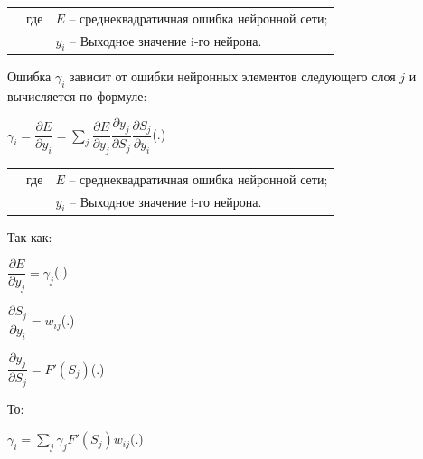 	\begin{tabular}{p{}p{}p{}}
		& где  & $E$ {--} среднеквадратичная ошибка нейронной сети; \\
		&      & $y_{i}$ {--} Выходное значение i-го нейрона. \\
	\end{tabular}
	
	\par \redline Ошибка $\gamma_{i}$ зависит от ошибки нейронных элементов следующего слоя $j$ и вычисляется по формуле:
	
	\formulaspace \par \redline 
	$\gamma_{i} =  \dfrac{\partial E}{\partial y_i} = \sum \limits _{j}^{} \dfrac{\partial E}{\partial y_j} \dfrac{\partial y_j}{\partial S_j} \dfrac{\partial S_j}{\partial y_i} $\hfill (\thechaptercntr .\theformulacntr) \redline
	\formulaspace \addtocounter{formulacntr}{1}
	
	\begin{tabular}{p{}p{}p{}}
		& где  & $E$ {--} среднеквадратичная ошибка нейронной сети; \\
		&      & $y_{i}$ {--} Выходное значение i-го нейрона. \\
	\end{tabular}
	
	\par \redline Так как:
	
	\formulaspace \par \redline 
	$ \dfrac{\partial E}{\partial y_j} = \gamma_{j} $\hfill (\thechaptercntr .\theformulacntr) \redline
	\formulaspace \addtocounter{formulacntr}{1}
	
	\formulaspace \par \redline 
	$ \dfrac{\partial S_j}{\partial y_i} = w_{ij}$\hfill (\thechaptercntr .\theformulacntr) \redline
	\formulaspace \addtocounter{formulacntr}{1}
	
	\formulaspace \par \redline 
	$ \dfrac{\partial y_j}{\partial S_j} = F'(S_{j})$\hfill (\thechaptercntr .\theformulacntr) \redline
	\formulaspace \addtocounter{formulacntr}{1}
	
	\par \redline То:
	
	\formulaspace \par \redline 
	$\gamma_{i} =  \sum \limits _{j}^{} \gamma_{j} F'(S_{j}) w_{ij}$\hfill (\thechaptercntr .\theformulacntr) \redline
	\formulaspace \addtocounter{formulacntr}{1}
	
